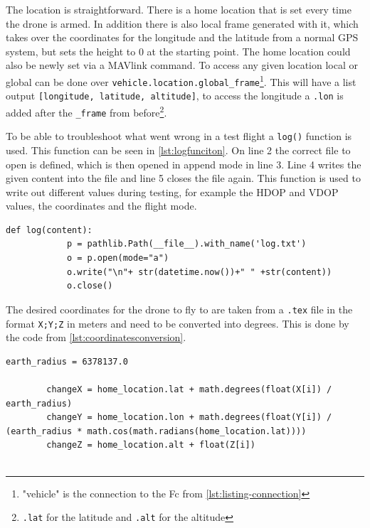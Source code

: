 \documentclass[svgnames]{article}
\begin{document}
	The location is straightforward. There is a home location that is set every time the drone is armed. In addition there is also local frame generated with it, which takes over the coordinates for the longitude and the latitude from a normal \gls{GPS} system, but sets the height to 0 at the starting point. The home location could also be newly set via a MAVlink command. To access any given location local or global can be done over \lstinline|vehicle.location.global_frame|\footnote{"vehicle" is the connection to the \gls{Fc} from \cref{lst:listing-connection}}. This will have a list output \lstinline|[longitude, latitude, altitude]|, to access the longitude a \lstinline|.lon| is added after the \lstinline|_frame| from before\footnote{\lstinline|.lat| for the latitude and \lstinline|.alt| for the altitude}.
	
	To be able to troubleshoot what went wrong in a test flight a \lstinline|log()| function is used. This function can be seen in \cref{lst:logfunciton}. On line 2 the correct file to open is defined, which is then opened in append mode in line 3. Line 4 writes the given content into the file and line 5 closes the file again. This function is used to write out different values during testing, for example the \gls{HDOP} and \gls{VDOP} values, the coordinates and the flight mode.

	\begin{lstlisting}[style=myPython, caption={log function}, label=lst:logfunciton]
		def log(content):
			p = pathlib.Path(__file__).with_name('log.txt')
			o = p.open(mode="a")
			o.write("\n"+ str(datetime.now())+"	" +str(content))
			o.close()
	\end{lstlisting}
	
	The desired coordinates for the drone to fly to are taken from a \lstinline|.tex| file in the format \lstinline|X;Y;Z| in meters and need to be converted into degrees. This is done by the code from \cref{lst:coordinatesconversion}.
	
	\begin{lstlisting}[style=myPython, caption= coordinate conversion, label=lst:coordinatesconversion]
		earth_radius = 6378137.0
		
		changeX = home_location.lat + math.degrees(float(X[i]) / earth_radius)
		changeY = home_location.lon + math.degrees(float(Y[i]) / (earth_radius * math.cos(math.radians(home_location.lat))))
		changeZ = home_location.alt + float(Z[i])
		
	\end{lstlisting}
	
\end{document}
